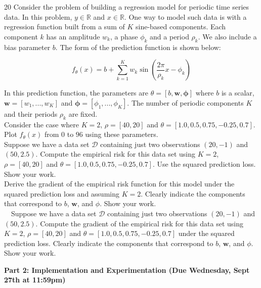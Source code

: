 \documentclass[11pt]{article}
\newcommand{\mbf}[1]{{\mathbf{#1}}}
\begin{document}
\begin{problem}{20} Consider the problem of building a regression model for periodic time series data. In this problem, $y\in\mathbb{R}$ and $x\in\mathbb{R}$. One way to model such data is with a regression function built from a sum of $K$ sine-based components. Each component $k$ has an amplitude $w_k$, a phase $\phi_k$ and a period $\rho_k$. We also include a bias parameter $b$. The form of the prediction function is shown below:     

$$f_{\theta}(x) = b + \sum_{k=1}^K w_k \sin\left(\frac{2\pi}{\rho_k}x-\phi_k\right)$$

In this prediction function, the parameters are $\theta=[b,\mbf{w}, \mbf{\phi}]$ where $b$ is a scalar, $\mbf{w}=[w_1,...,w_K]$ and $\mbf{\phi}=[\phi_1,...,\phi_K]$. The number of periodic components $K$ and their periods $\rho_k$ are fixed.\\ 

 Consider the case where $K=2$, $\rho=[40,20]$
and $\theta=[1.0,0.5,0.75,-0.25,0.7]$. Plot $f_{\theta}(x)$ from $0$ to $96$ using these parameters.\\

 Suppose we have a data set $\mathcal{D}$ containing just two observations $(20,-1)$ and $(50,2.5)$. Compute the empirical risk for this data set using $K=2$, $\rho=[40,20]$ and $\theta=[1.0,0.5,0.75,-0.25,0.7]$. Use the squared prediction loss. Show your work.\\

 Derive the gradient of the empirical risk function for this model under the squared prediction loss and assuming $K=2$. Clearly indicate the components that correspond to $b$, $\mbf{w}$, and $\phi$. Show your work.\\

 ~~Suppose we have a data set $\mathcal{D}$ containing just two observations $(20,-1)$ and $(50,2.5)$. Compute the gradient of the empirical risk for this data set using $K=2$, $\rho=[40,20]$ and $\theta=[1.0,0.5,0.75,-0.25,0.7]$ under the squared prediction loss. Clearly indicate the components that correspond to $b$, $\mbf{w}$, and $\phi$. Show your work.\\

\end{problem}

\clearpage
\vspace{1em}
\textbf{Part 2: Implementation and Experimentation (Due Wednesday, Sept 27th at 11:59pm)}
\end{document}
